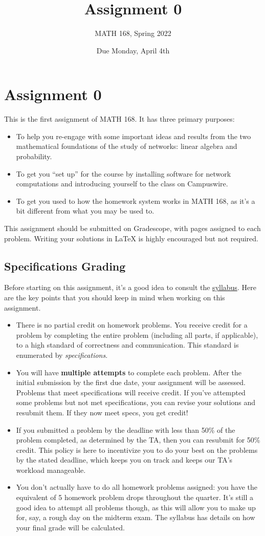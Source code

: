 \documentclass{hw}
\title{Assignment 0}
\author{MATH 168, Spring 2022}
\date{Due Monday, April 4th}
\begin{document}
\section*{Assignment 0}

This is the first assignment of MATH 168. 
It has three primary purposes: 
\begin{itemize}
    \item To help you re-engage with some important ideas and results from the two mathematical foundations of the study of networks: linear algebra and probability. 
    \item To get you ``set up'' for the course by installing software for network computations and introducing yourself to the class on Campuswire. 
    \item To get you used to how the homework system works in MATH 168, as it's a bit different from what you may be used to. 
\end{itemize}
This assignment should be submitted on Gradescope, with pages assigned to each problem.  
Writing your solutions in \LaTeX{} is highly encouraged but not required. 

\subsection*{Specifications Grading}

Before starting on this assignment, it's a good idea to consult the \href{https://www.philchodrow.com/intro-networks/syllabus/syllabus.html#homework-assignments}{syllabus}. 
Here are the key points that you should keep in mind when working on this assignment.
\begin{itemize}
    \item There is no partial credit on homework problems. You receive credit for a problem by completing the entire problem (including all parts, if applicable), to a high standard of correctness and communication. 
    This standard is enumerated by \emph{specifications}. 
    \item You will have \textbf{multiple attempts} to complete each problem. 
    After the initial submission by the first due date, your assignment will be assessed. 
    Problems that meet specifications will receive credit. 
    If you've attempted some problems but not met specifications, you can revise your solutions and resubmit them. 
    If they now meet specs, you get credit! 
    \item If you submitted a problem by the deadline with less than 50\% of the problem completed, as determined by the TA, then you can resubmit for 50\% credit. 
    This policy is here to incentivize you to do your best on the problems by the stated deadline, which keeps you on track and keeps our TA's workload manageable. 
    \item You don't actually have to do all homework problems assigned: you have the equivalent of 5 homework problem drops throughout the quarter. 
    It's still a good idea to attempt all problems though, as this will allow you to make up for, say, a rough day on the midterm exam. 
    The syllabus has details on how your final grade will be calculated. 
\end{itemize}
\end{document}
